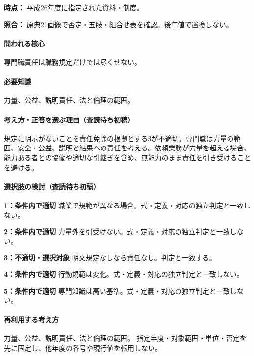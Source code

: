 \noindent\textbf{時点：} 平成26年度に指定された資料・制度。\par

\noindent\textbf{照合：} 原典21画像で否定・五肢・組合せ表を確認。後年値で置換しない。\par

\paragraph{問われる核心} 専門職責任は職務規定だけでは尽くせない。

\paragraph{必要知識} 力量、公益、説明責任、法と倫理の範囲。

\paragraph{考え方・正答を選ぶ理由（査読待ち初稿）} 規定に明示がないことを責任免除の根拠とする3が不適切。専門職は力量の範囲、安全・公益、説明と結果への責任を考える。依頼業務が力量を超える場合、能力ある者との協働や適切な引継ぎを含め、無能力のまま責任を引き受けることを避ける。

\paragraph{選択肢の検討（査読待ち初稿）}\mbox{}\par

\noindent\textbf{1：条件内で適切} 職業で規範が異なる場合。式・定義・対応の独立判定と一致しない。\par

\noindent\textbf{2：条件内で適切} 力量外を引受けない。式・定義・対応の独立判定と一致しない。\par

\noindent\textbf{3：不適切・選択対象} 明文規定なしなら責任なし。判定と一致する。\par

\noindent\textbf{4：条件内で適切} 行動規範は変化。式・定義・対応の独立判定と一致しない。\par

\noindent\textbf{5：条件内で適切} 専門知識は高い基準。式・定義・対応の独立判定と一致しない。\par

\paragraph{再利用する考え方} 力量、公益、説明責任、法と倫理の範囲。 指定年度・対象範囲・単位・否定を先に固定し、他年度の番号や現行値を転用しない。

